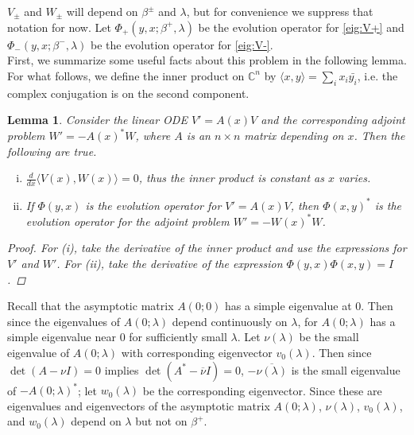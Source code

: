 \documentclass[12pt]{article}
\def\C{{\mathbb C}}
\newtheorem{lemma}{Lemma}
\begin{document}
$V_\pm$ and $W_\pm$ will depend on $\beta^\pm$ and $\lambda$, but for convenience we suppress that notation for now. Let $\Phi_+(y, x; \beta^+, \lambda)$ be the evolution operator for \eqref{eig:V+} and $\Phi_-(y, x; \beta^-, \lambda)$ be the evolution operator for \eqref{eig:V-}.\\

First, we summarize some useful facts about this problem in the following lemma. For what follows, we define the inner product on $\C^n$ by $\langle x, y \rangle = \sum_i x_i \bar{y_i}$, i.e. the complex conjugation is on the second component.


\begin{lemma}\label{eigadjoint}
Consider the linear ODE $V' = A(x)V$ and the corresponding adjoint problem $W' = -A(x)^* W$, where $A$ is an $n \times n$ matrix depending on $x$. Then the following are true.
\begin{enumerate}[(i)]
\item $\frac{d}{dx}\langle V(x), W(x) \rangle = 0$, thus the inner product is constant as $x$ varies.
\item If $\Phi(y, x)$ is the evolution operator for $V' = A(x)V$, then $\Phi(x, y)^*$ is the evolution operator for the adjoint problem $W' = -W(x)^* W$.
\end{enumerate}
\begin{proof}
For (i), take the derivative of the inner product and use the expressions for $V'$ and $W'$. For (ii), take the derivative of the expression $\Phi(y, x)\Phi(x, y) = I$.
\end{proof}
\end{lemma}

Recall that the asymptotic matrix $A(0; 0)$ has a simple eigenvalue at 0. Then since the eigenvalues of $A(0; \lambda)$ depend continuously on $\lambda$, for $A(0; \lambda)$ has a simple eigenvalue near 0 for sufficiently small $\lambda$. Let $\nu(\lambda)$ be the small eigenvalue of $A(0; \lambda)$ with corresponding eigenvector $v_0(\lambda)$. Then since $\det(A - \nu I) = 0$ implies $\det(A^* - \overline{\nu}I) = 0$, $-\overline{\nu(\lambda)}$ is the small eigenvalue of $-A(0; \lambda)^*$; let $w_0(\lambda)$ be the corresponding eigenvector. Since these are eigenvalues and eigenvectors of the asymptotic matrix $A(0; \lambda)$, $\nu(\lambda)$, $v_0(\lambda)$, and $w_0(\lambda)$ depend on $\lambda$ but not on $\beta^+$.\\
\end{document}
